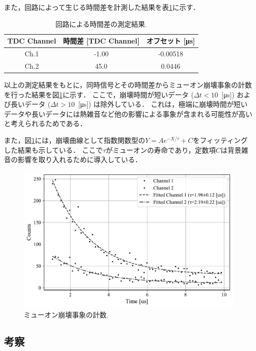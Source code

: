 \documentclass[uplatex,dvipdfmx,a4j,12pt]{jsarticle}
\begin{document}
また，回路によって生じる時間差を計測した結果を表\ref{tab:offset}に示す．
\begin{table}[H]
  \centering
  \caption{回路による時間差の測定結果.}
  \label{tab:offset}
  \begin{tabular}{ccc}
    \hline
    TDC Channel & 時間差 [TDC Channel] & オフセット [\si{\micro\second}] \\
    \hline
    Ch.1 & -1.00 & -0.00518 \\
    Ch.2 & 45.0 & 0.0446 \\
    \hline
  \end{tabular}
\end{table}

以上の測定結果をもとに，同時信号とその時間差からミューオン崩壊事象の計数を行った結果を図\ref{fig:muon_decay}に示す．
ここで，崩壊時間が短いデータ ($\Delta t < 10$\, [\si{\micro\second}]) および長いデータ ($\Delta t > 10$\, [\si{\micro\second}]) は除外している．
これは，極端に崩壊時間が短いデータや長いデータには熱雑音など他の影響による事象が含まれる可能性が高いと考えられるためである．

また，図\ref{fig:muon_decay}には，崩壊曲線として指数関数型の$Y = A e^{-X/\tau} + C$をフィッティングした結果も示している．
ここで$\tau$がミューオンの寿命であり，定数項$C$は背景雑音の影響を取り入れるために導入している．

\begin{figure}[H]
  \includegraphics[width=0.85\linewidth]{analysis/lifetime_measurement.pdf}
  \caption{ミューオン崩壊事象の計数.}
  \label{fig:muon_decay}
\end{figure}






\subsection{考察}
\end{document}
